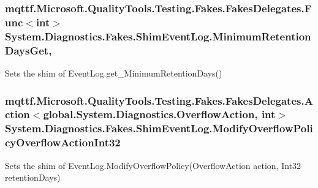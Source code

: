 \hypertarget{class_system_1_1_diagnostics_1_1_fakes_1_1_shim_event_log_ac74e3bb34a83d583d59d3fda43697b42}{
\subsubsection[{Minimum\-Retention\-Days\-Get}]{\setlength{\rightskip}{0pt plus 5cm}mqttf.\-Microsoft.\-Quality\-Tools.\-Testing.\-Fakes.\-Fakes\-Delegates.\-Func$<$int$>$ System.\-Diagnostics.\-Fakes.\-Shim\-Event\-Log.\-Minimum\-Retention\-Days\-Get\hspace{0.3cm}{\ttfamily [get]}, {\ttfamily [set]}}}\label{class_system_1_1_diagnostics_1_1_fakes_1_1_shim_event_log_ac74e3bb34a83d583d59d3fda43697b42}


Sets the shim of Event\-Log.\-get\-\_\-\-Minimum\-Retention\-Days()

\hypertarget{class_system_1_1_diagnostics_1_1_fakes_1_1_shim_event_log_a81a3d463695d0d2fd2628f4d40dd79eb}{
\subsubsection[{Modify\-Overflow\-Policy\-Overflow\-Action\-Int32}]{\setlength{\rightskip}{0pt plus 5cm}mqttf.\-Microsoft.\-Quality\-Tools.\-Testing.\-Fakes.\-Fakes\-Delegates.\-Action$<$global.\-System.\-Diagnostics.\-Overflow\-Action, int$>$ System.\-Diagnostics.\-Fakes.\-Shim\-Event\-Log.\-Modify\-Overflow\-Policy\-Overflow\-Action\-Int32\hspace{0.3cm}{\ttfamily [set]}}}\label{class_system_1_1_diagnostics_1_1_fakes_1_1_shim_event_log_a81a3d463695d0d2fd2628f4d40dd79eb}


Sets the shim of Event\-Log.\-Modify\-Overflow\-Policy(\-Overflow\-Action action, Int32 retention\-Days)

